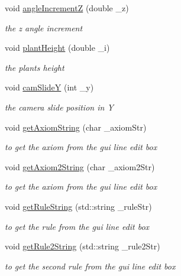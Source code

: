 \begin{DoxyCompactItemize}
void \hyperlink{classGLWindow_a578d29435e038115f63fc895c39d5a02}{angleIncrementZ} (double \_\-z)
\begin{DoxyCompactList}\small\item\em the z angle increment \item\end{DoxyCompactList}\item 
void \hyperlink{classGLWindow_aba4dedcbeb2c00303357e39115f70fe2}{plantHeight} (double \_\-i)
\begin{DoxyCompactList}\small\item\em the plants height \item\end{DoxyCompactList}\item 
void \hyperlink{classGLWindow_a0661e6689c42d4ddfb97117de6e343bc}{camSlideY} (int \_\-y)
\begin{DoxyCompactList}\small\item\em the camera slide position in Y \item\end{DoxyCompactList}\item 
void \hyperlink{classGLWindow_a317631af1f77dc4e7e42ddf39d58fa9f}{getAxiomString} (char \_\-axiomStr)
\begin{DoxyCompactList}\small\item\em to get the axiom from the gui line edit box \item\end{DoxyCompactList}\item 
void \hyperlink{classGLWindow_ad7b47965c7ad9dc0830ad66d1ecc141f}{getAxiom2String} (char \_\-axiom2Str)
\begin{DoxyCompactList}\small\item\em to get the axiom from the gui line edit box \item\end{DoxyCompactList}\item 
void \hyperlink{classGLWindow_acf22215731822fcd7d460bd1e6c3d312}{getRuleString} (std::string \_\-ruleStr)
\begin{DoxyCompactList}\small\item\em to get the rule from the gui line edit box \item\end{DoxyCompactList}\item 
void \hyperlink{classGLWindow_a9ead24bdf6bb3331ae99e4447970cb52}{getRule2String} (std::string \_\-rule2Str)
\begin{DoxyCompactList}\small\item\em to get the second rule from the gui line edit box \item\end{DoxyCompactList}\end{DoxyCompactItemize}
